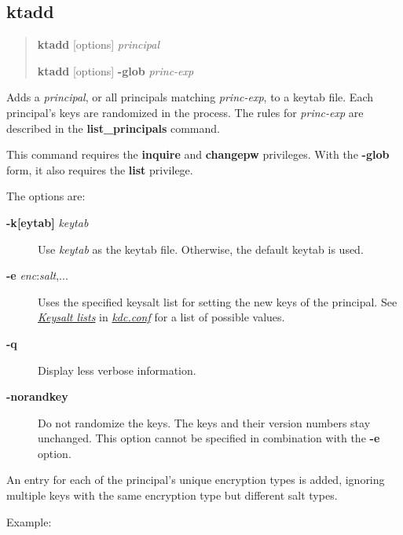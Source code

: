 \documentclass[letterpaper,10pt,english]{sphinxmanual}
\begin{document}
\subsection{ktadd}
\label{admin/appl_servers:ktadd}\begin{quote}

\begin{DUlineblock}{0em}
\item[] \textbf{ktadd} {[}options{]} \emph{principal}
\item[] \textbf{ktadd} {[}options{]} \textbf{-glob} \emph{princ-exp}
\end{DUlineblock}
\end{quote}

Adds a \emph{principal}, or all principals matching \emph{princ-exp}, to a
keytab file.  Each principal's keys are randomized in the process.
The rules for \emph{princ-exp} are described in the \textbf{list\_principals}
command.

This command requires the \textbf{inquire} and \textbf{changepw} privileges.
With the \textbf{-glob} form, it also requires the \textbf{list} privilege.

The options are:
\begin{description}
\item[{\textbf{-k{[}eytab{]}} \emph{keytab}}] \leavevmode
Use \emph{keytab} as the keytab file.  Otherwise, the default keytab is
used.

\item[{\textbf{-e} \emph{enc}:\emph{salt},...}] \leavevmode
Uses the specified keysalt list for setting the new keys of the
principal.  See {\hyperref[admin/conf_files/kdc_conf:keysalt-lists]{\emph{Keysalt lists}}} in {\hyperref[admin/conf_files/kdc_conf:kdc-conf-5]{\emph{kdc.conf}}} for a
list of possible values.

\item[{\textbf{-q}}] \leavevmode
Display less verbose information.

\item[{\textbf{-norandkey}}] \leavevmode
Do not randomize the keys. The keys and their version numbers stay
unchanged.  This option cannot be specified in combination with the
\textbf{-e} option.

\end{description}

An entry for each of the principal's unique encryption types is added,
ignoring multiple keys with the same encryption type but different
salt types.

Example:
\end{document}
